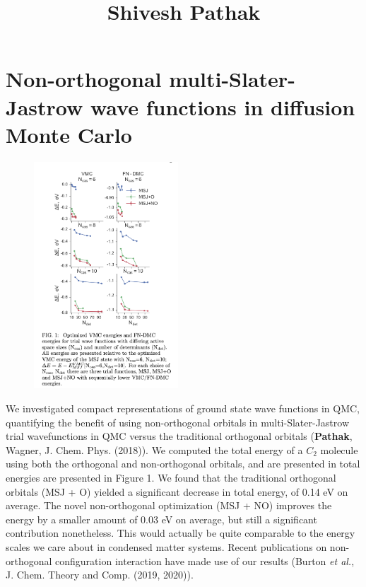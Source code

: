\documentclass{article}
\title{Shivesh Pathak}
\date{\vspace{-10ex}}
\begin{document}
\maketitle

\section{Non-orthogonal multi-Slater-Jastrow wave functions in diffusion Monte Carlo}
\begin{figure}
	\includegraphics[width=0.48\textwidth]{nonortho.png}
\end{figure}
We investigated compact representations of ground state wave functions in QMC,  quantifying the benefit of using non-orthogonal orbitals in multi-Slater-Jastrow trial wavefunctions in QMC versus the traditional orthogonal orbitals (\textbf{Pathak}, Wagner,  J. Chem. Phys.  (2018)).
We computed the total energy of a $C_2$ molecule using both the orthogonal and non-orthogonal orbitals, and are presented in total energies are presented in Figure 1. 
We found that the traditional orthogonal orbitals (MSJ + O) yielded a significant decrease in total energy, of 0.14 eV on average.
The novel non-orthogonal optimization (MSJ + NO) improves the energy by a smaller amount of  0.03 eV on average, but still a significant contribution nonetheless.
This would actually be quite comparable to the energy scales we care about in condensed matter systems.
Recent publications on non-orthogonal configuration interaction have made use of our results (Burton \textit{et al.}, J. Chem. Theory and Comp. (2019, 2020)).
\end{document}
